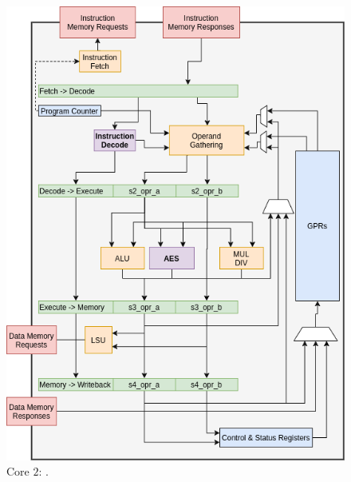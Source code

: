 \begin{figure}
\centering
\includegraphics[scale=0.45,angle=90]{diagrams/scarv-cpu-uarch.png}
\caption{Core $2$: .}
\label{fig:design:cpu_block:2}
\end{figure}

